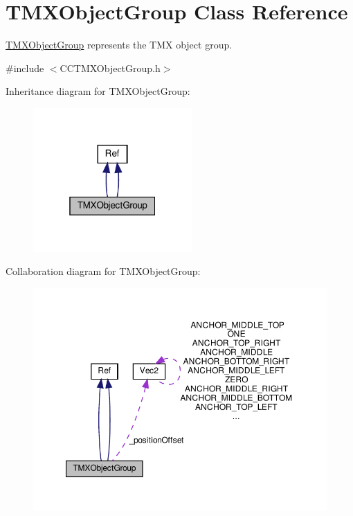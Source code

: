 \hypertarget{classTMXObjectGroup}{}\section{T\+M\+X\+Object\+Group Class Reference}
\label{classTMXObjectGroup}


\hyperlink{classTMXObjectGroup}{T\+M\+X\+Object\+Group} represents the T\+MX object group.  




{\ttfamily \#include $<$C\+C\+T\+M\+X\+Object\+Group.\+h$>$}



Inheritance diagram for T\+M\+X\+Object\+Group\+:
\nopagebreak
\begin{figure}[H]
\begin{center}
\leavevmode
\includegraphics[width=172pt]{classTMXObjectGroup__inherit__graph}
\end{center}
\end{figure}


Collaboration diagram for T\+M\+X\+Object\+Group\+:
\nopagebreak
\begin{figure}[H]
\begin{center}
\leavevmode
\includegraphics[width=350pt]{classTMXObjectGroup__coll__graph}
\end{center}
\end{figure}
